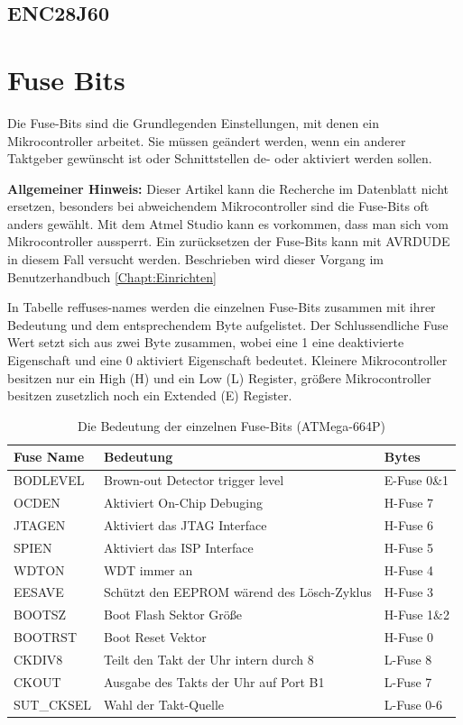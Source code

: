 \subsection{ENC28J60}

\section{Fuse Bits}
\label{chap:Fuse}

Die Fuse-Bits sind die Grundlegenden Einstellungen, mit denen ein
Mikrocontroller arbeitet. Sie müssen geändert werden, wenn ein anderer Taktgeber
gewünscht ist oder Schnittstellen de- oder aktiviert werden sollen.

\begin{myframe}
\textbf{Allgemeiner Hinweis:} Dieser Artikel kann die Recherche im Datenblatt
nicht ersetzen, besonders bei abweichendem Mikrocontroller sind die Fuse-Bits
oft anders gewählt. Mit dem Atmel Studio kann es vorkommen, dass man sich vom
Mikrocontroller aussperrt. Ein zurücksetzen der Fuse-Bits kann mit AVRDUDE
in diesem Fall versucht werden. Beschrieben wird dieser Vorgang im
Benutzerhandbuch \ref{Chapt:Einrichten}
\end{myframe}

In Tabelle ref{fuses-names} werden die einzelnen Fuse-Bits zusammen mit ihrer
Bedeutung und dem entsprechendem Byte aufgelistet. Der Schlussendliche Fuse Wert
setzt sich aus zwei Byte zusammen, wobei eine 1 eine deaktivierte Eigenschaft und
eine 0 aktiviert Eigenschaft bedeutet. Kleinere Mikrocontroller besitzen nur ein
High (H) und ein Low (L) Register, größere Mikrocontroller besitzen zusetzlich
noch ein Extended (E) Register.

\begin{table} [H]
\begin{tabular}{|l|l|l|} \hline
Fuse Name & Bedeutung & Bytes\\ \hline
BODLEVEL & Brown-out Detector trigger level & E-Fuse 0\&1\\ \hline
OCDEN & Aktiviert On-Chip Debuging & H-Fuse 7\\ \hline
JTAGEN & Aktiviert das \ac{JTAG} Interface & H-Fuse 6\\ \hline
SPIEN & Aktiviert das \ac{ISP} Interface & H-Fuse 5\\ \hline
WDTON & \ac{WDT} immer an & H-Fuse 4\\ \hline
EESAVE & Schützt den \acs{EEPROM} wärend des Lösch-Zyklus & H-Fuse 3\\ \hline
BOOTSZ & Boot Flash Sektor Größe & H-Fuse 1\&2\\ \hline
BOOTRST & Boot Reset Vektor & H-Fuse 0\\ \hline
CKDIV8 & Teilt den Takt der Uhr intern durch 8 & L-Fuse 8\\ \hline
CKOUT & Ausgabe des Takts der Uhr auf Port B1 & L-Fuse 7\\ \hline
SUT\_CKSEL & Wahl der Takt-Quelle & L-Fuse 0-6\\ \hline
\end{tabular}
\caption{Die Bedeutung der einzelnen Fuse-Bits (ATMega-664P)}
\label{fuses-names}
\end{table}

